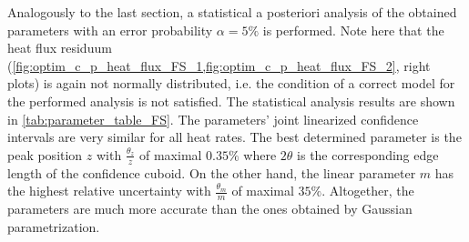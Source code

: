 \documentclass{scrartcl}[12pt, halfparskip]
\numberwithin{equation}{section}
\numberwithin{figure}{section}
\numberwithin{table}{section}
\begin{document}
Analogously to the last section, a statistical a posteriori analysis of the obtained parameters with an error probability $\alpha = 5\%$ is performed. Note here that the heat flux residuum (\cref{fig:optim_c_p_heat_flux_FS_1,fig:optim_c_p_heat_flux_FS_2}, right plots) is again not normally distributed, i.e. the condition of a correct model for the performed analysis is not satisfied.
The statistical analysis results are shown in \cref{tab:parameter_table_FS}. The parameters' joint linearized confidence intervals are very similar for all heat rates. The best determined parameter is the peak position $z$ with $\frac{\theta_z}{z}$ of maximal $0.35\%$ where $2 \theta$ is the corresponding edge length of the confidence cuboid. On the other hand, the linear parameter $m$ has the highest relative uncertainty with $\frac{\theta_m}{m}$ of maximal $35\%$. Altogether, the parameters are much more accurate than the ones obtained by Gaussian parametrization. 
\end{document}
